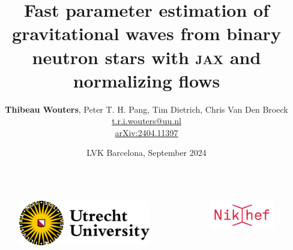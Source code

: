 \documentclass[usenames,dvipsnames,t]{beamer}
\title[arXiv:2404.11397] %
{Fast parameter estimation of gravitational waves from binary neutron stars with \textsc{jax} and normalizing flows}
\author[Thibeau Wouters]{\small{\textbf{Thibeau Wouters}, Peter T. H. Pang, Tim Dietrich, Chris Van Den Broeck} \\ \vspace{2mm} \href{mailto:t.r.i.wouters@uu.nl}{t.r.i.wouters@uu.nl} \newline \github \quad \linkedin \quad \twitter \\ \vspace{7mm} \href{http://arxiv.org/abs/2404.11397}{arXiv:2404.11397}}
\date{LVK Barcelona, September 2024}
\begin{document}
{


\begin{frame}[plain]
\titlepage

\begin{columns}
  \begin{figure}
    \centering
    \vspace{1.5mm}
    \includegraphics[width=0.75\linewidth]{Figures/utrecht-university.png}
  \end{figure}
  \begin{figure}
    \centering
    \includegraphics[width=0.75\linewidth]{Figures/Nikhef_logo-transparent.png}
  \end{figure}
\end{columns}



\end{frame}
}
\end{document}
